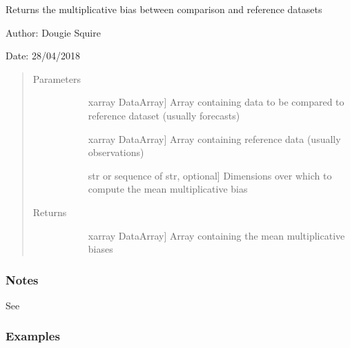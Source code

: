 \documentclass[letterpaper,10pt,english]{sphinxmanual}
\begin{document}
\begin{fulllineitems}
\label{\detokenize{skill_doc:skill.mean_multiplicative_bias}}
Returns the multiplicative bias between comparison and reference datasets

\begin{DUlineblock}{0em}
\item[] Author: Dougie Squire
\item[] Date: 28/04/2018
\end{DUlineblock}
\begin{quote}\begin{description}
\item[{Parameters}] \leavevmode\begin{description}
\item[{}] \leavevmode{[}xarray DataArray{]}
Array containing data to be compared to reference dataset (usually forecasts)

\item[{}] \leavevmode{[}xarray DataArray{]}
Array containing reference data (usually observations)

\item[{}] \leavevmode{[}str or sequence of str, optional{]}
Dimensions over which to compute the mean multiplicative bias

\end{description}

\item[{Returns}] \leavevmode\begin{description}
\item[{}] \leavevmode{[}xarray DataArray{]}
Array containing the mean multiplicative biases

\end{description}

\end{description}\end{quote}
\subsubsection*{Notes}

See 
\subsubsection*{Examples}


\end{fulllineitems}
\end{document}
